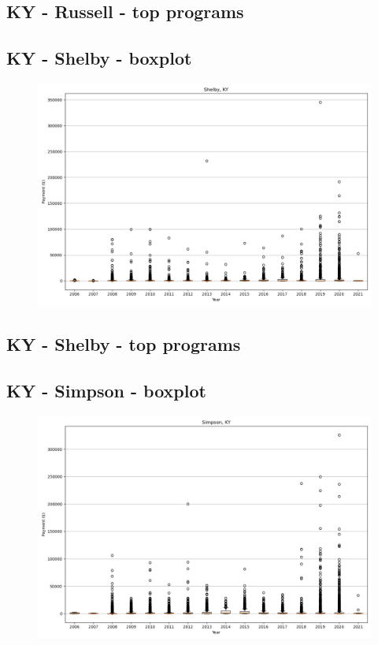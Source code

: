 \subsection*{KY - Russell - top programs}

\newpage
\subsection*{KY - Shelby - boxplot}
\begin{figure}[h]
\centering
\includegraphics[width=7in]{../output/boxplots/counties/Shelby-KY_boxplot.png}
\end{figure}


\subsection*{KY - Shelby - top programs}

\newpage
\subsection*{KY - Simpson - boxplot}
\begin{figure}[h]
\centering
\includegraphics[width=7in]{../output/boxplots/counties/Simpson-KY_boxplot.png}
\end{figure}



